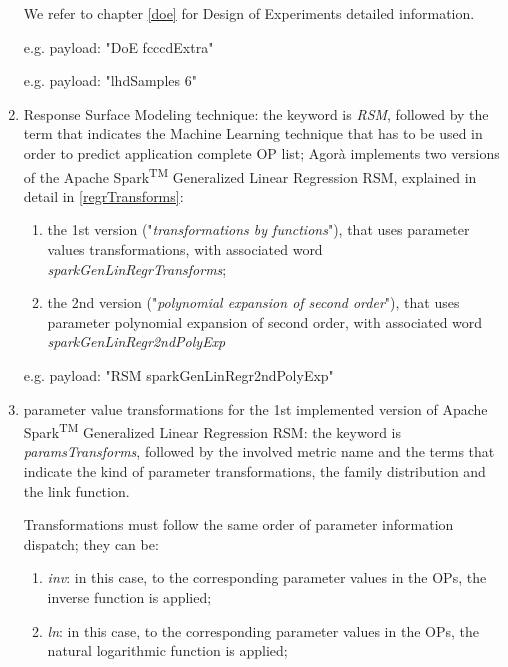\begin{enumerate}
    We refer to chapter \ref{doe} for Design of Experiments detailed information.
    
    e.g. payload: "DoE fcccdExtra"
    
    e.g. payload: "lhdSamples 6"
    
    \item Response Surface Modeling technique: the keyword is \textit{RSM}, followed by the term that indicates the Machine Learning technique that has to be used in order to predict application complete OP list; Agorà implements two versions of the Apache Spark\textsuperscript{TM} Generalized Linear Regression RSM, explained in detail in \ref{regrTransforms}:
    
    \begin{enumerate}
    
        \item the 1st version ("\textit{transformations by functions}"), that uses parameter values transformations, with associated word \textit{sparkGenLinRegrTransforms};
        
        \item the 2nd version ("\textit{polynomial expansion of second order}"), that uses parameter polynomial expansion of second order, with associated word \textit{sparkGenLinRegr2ndPolyExp}
    
    \end{enumerate}
    
    e.g. payload: "RSM sparkGenLinRegr2ndPolyExp"
    
    \item parameter value transformations for the 1st implemented version of Apache Spark\textsuperscript{TM} Generalized Linear Regression RSM: the keyword is \textit{paramsTransforms}, followed by the involved metric name and the terms that indicate the kind of parameter transformations, the family distribution and the link function.
    
    Transformations must follow the same order of parameter information dispatch; they can be:
    
    \begin{enumerate}
    
        \item \textit{inv}: in this case, to the corresponding parameter values in the OPs, the inverse function is applied;
        
        \item \textit{ln}: in this case, to the corresponding parameter values in the OPs, the natural logarithmic function is applied;
        

\end{enumerate}
\end{enumerate}
